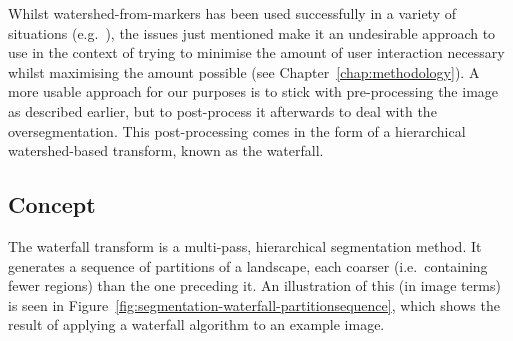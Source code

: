 Whilst watershed-from-markers has been used successfully in a variety of situations (e.g.~\cite{chae07,gonzalez07}), the issues just mentioned make it an undesirable approach to use in the context of trying to minimise the amount of user interaction necessary whilst maximising the amount possible (see Chapter~\ref{chap:methodology}). A more usable approach for our purposes is to stick with pre-processing the image as described earlier, but to post-process it afterwards to deal with the oversegmentation. This post-processing comes in the form of a hierarchical watershed-based transform, known as the waterfall.

\subsection{Concept}

The waterfall transform is a multi-pass, hierarchical segmentation method. It generates a sequence of partitions of a landscape, each coarser (i.e.~containing fewer regions) than the one preceding it. An illustration of this (in image terms) is seen in Figure~\ref{fig:segmentation-waterfall-partitionsequence}, which shows the result of applying a waterfall algorithm to an example image.

